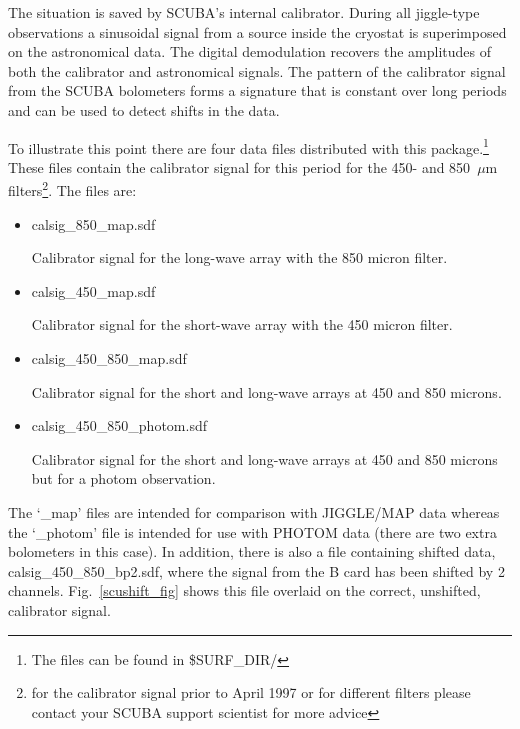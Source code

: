 \documentclass[twoside,11pt]{starlink}
\begin{document}
The situation is saved by SCUBA's internal calibrator. During all
jiggle-type observations a sinusoidal signal from a source inside the
cryostat is superimposed on the astronomical data. The digital
demodulation recovers the amplitudes of both the calibrator and
astronomical signals. The pattern of the calibrator signal from the SCUBA
bolometers forms a signature that is constant over long periods and can be
used to detect shifts in the data.

To illustrate this point there are four data files distributed with this
package.\footnote{The files can be found in \$SURF\_DIR/}
These files contain the calibrator signal for this period for the
450- and 850~$\mu$m filters\footnote{for the calibrator signal prior to April
1997 or for different filters please contact your SCUBA support scientist for
more advice}. The files are:

\begin{itemize}
\item calsig\_850\_map.sdf

Calibrator signal for the long-wave array with the 850 micron filter.

\item calsig\_450\_map.sdf

Calibrator signal for the short-wave array with the 450 micron filter.

\item calsig\_450\_850\_map.sdf

Calibrator signal for the short and long-wave arrays at 450 and 850 microns.

\item calsig\_450\_850\_photom.sdf

Calibrator signal for the short and long-wave arrays at 450 and 850 microns
but for a photom observation.

\end{itemize}

The `\_map' files are intended for comparison with JIGGLE/MAP data whereas the
`\_photom' file is intended for use with PHOTOM data (there are two extra
bolometers in this case).  In addition, there is also a file containing
shifted data, calsig\_450\_850\_bp2.sdf, where the signal from the B card has
been shifted by 2 channels. Fig.\ \ref{scushift_fig} shows this file overlaid
on the correct, unshifted, calibrator signal.
\end{document}
